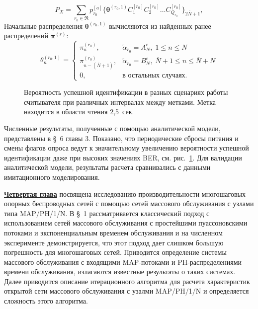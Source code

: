 $$
	P_X = \sum\limits_{r_0 \in \mathfrak{R}} p_{r_0}^{[a]} \{ \bm{\theta}^{(r_0,1)} C_1^{[r_0]} C_2^{[r_0]} \dots C_{Q_{r_0}}^{[r_0]} \}_{2\overline{N}+1},
$$
Начальные распределения $\bm{\theta}^{(r_0,1)}$ вычисляются из найденных ранее распределений $\bm{\pi}^{(r)}$:
$$
  \theta_n^{(r_0,1)} = \begin{cases}
    \pi^{(r_0)}_n,                      &\widetilde{\alpha}_{r_0} = A^e_N,\; 1 \leqslant n \leqslant N\\
    \pi^{(r_0)}_{n - (\overline{N}+1)}, &\widetilde{\alpha}_{r_0} = B^e_N,\; \overline{N}+1 \leqslant n \leqslant \overline{N}+N\\
    0,                                  &\text{в остальных случаях.}
  \end{cases}
$$

\begin{figure}[ht!]
  \caption{Вероятность успешной идентификации в разных сценариях работы считывателя при различных интервалах между метками. Метка находится в области чтения 2,5~сек.}\label{fig:id_prob_var_scenario}
\end{figure}

Численные результаты, полученные с помощью аналитической модели, представлены в \S~6 главы 3. Показано, что периодические сбросы питания и смены флагов опроса ведут к значительному увеличению вероятности успешной идентификации даже при высоких значениях BER, см. рис.~\ref{fig:id_prob_var_scenario}. Для валидации аналитической модели, результаты расчета сравнивались с данными имитационного моделирования.



\underline{\textbf{Четвертая глава}} посвящена исследованию производительности многошаговых опорных беспроводных сетей с помощью сетей массового обслуживания с узлами типа MAP/PH/1/N. В \S~1 рассматривается классический подход с использованием сетей массового обслуживания с простейшими пуассоновскими потоками и экспоненциальным временем обслуживания и на численном эксперименте демонстрируется, что этот подход дает слишком большую погрешность для многошаговых сетей. Приводится определение системы массового обслуживания с входящими MAP-потоками и PH-распределениями времени обслуживания, излагаются известные результаты о таких системах. Далее приводится описание итерационного алгоритма для расчета характеристик открытой сети массового обслуживания с узалми MAP/PH/1/N и определяется сложность этого алгоритма.

